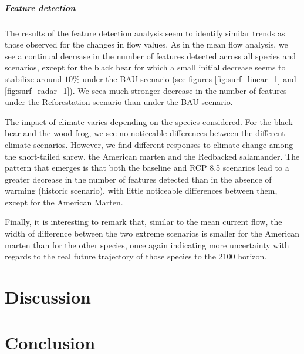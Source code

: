 \vspace{1em}

\subparagraph*{\textit{Feature detection}} The results of the feature detection analysis seem to identify similar trends as those observed for the changes in flow values. As in the mean flow analysis, we see a continual decrease in the number of features detected across all species and scenarios, except for the black bear for which a small initial decrease seems to stabilize around $10\%$ under the BAU scenario (see figures \ref{fig:surf_linear_1} and \ref{fig:surf_radar_1}). We seea much stronger decrease in the number of features under the Reforestation scenario than under the BAU scenario.

The impact of climate varies depending on the species considered. For the black bear and the wood frog, we see no noticeable differences between the different climate scenarios. However, we find different responses to climate change among the short-tailed shrew, the American marten and the Redbacked salamander. The pattern that emerges is that both the baseline and RCP 8.5 scenarios lead to a greater decrease in the number of features detected than in the absence of warming (historic scenario), with little noticeable differences between them, except for the American Marten.

Finally, it is interesting to remark that, similar to the mean  current flow, the width of difference between the two extreme scenarios is smaller for the American marten than for the other species, once again indicating more uncertainty with regards to the real future trajectory of those species to the 2100 horizon.\\

\section{Discussion}


\section{Conclusion}


